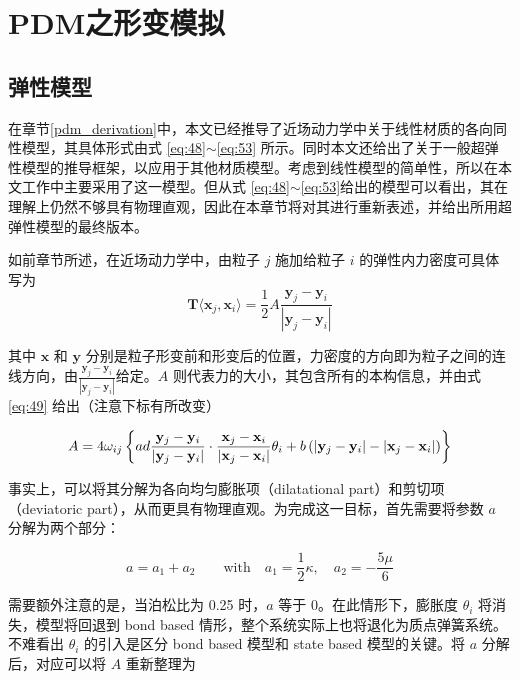 ﻿\chapter{PDM之形变模拟}

\section{弹性模型}
\label{elasitcity_model}

在章节\ref{pdm_derivation}中，本文已经推导了近场动力学中关于线性材质的各向同性模型，其具体形式由式 \ref{eq:48}$\sim$\ref{eq:53} 所示。同时本文还给出了关于一般超弹性模型的推导框架，以应用于其他材质模型。考虑到线性模型的简单性，所以在本文工作中主要采用了这一模型。但从式 \ref{eq:48}$\sim$\ref{eq:53}给出的模型可以看出，其在理解上仍然不够具有物理直观，因此在本章节将对其进行重新表述，并给出所用超弹性模型的最终版本。

如前章节所述，在近场动力学中，由粒子 $j$ 施加给粒子 $i$ 的弹性内力密度可具体写为
\begin{equation}
\mathbf{T}\langle\mathbf{x}_j,\mathbf{x}_i\rangle = \frac{1}{2}A\frac{\mathbf{y}_j-\mathbf{y}_i}{|\mathbf{y}_j-\mathbf{y}_i|}
\end{equation}

其中 $\mathbf{x}$ 和 $\mathbf{y}$ 分别是粒子形变前和形变后的位置，力密度的方向即为粒子之间的连线方向，由$\frac{\mathbf{y}_j-\mathbf{y}_i}{|\mathbf{y}_j-\mathbf{y}_i|}$给定。$A$ 则代表力的大小，其包含所有的本构信息，并由式 \ref{eq:49} 给出（注意下标有所改变）

\begin{equation}
A = 4\omega_{ij}\left\{ad\frac{\mathbf{y}_j-\mathbf{y}_i}{|\mathbf{y}_j-\mathbf{y}_i|}\cdot\frac{\mathbf{x}_j-\mathbf{x}_i}{|\mathbf{x}_j-\mathbf{x}_i|}\theta_i
   +b\left(|\mathbf{y}_j - \mathbf{y}_i| - |\mathbf{x}_j - \mathbf{x}_i|\right) \right\}
\end{equation}

事实上，可以将其分解为各向均匀膨胀项（dilatational part）和剪切项（deviatoric part），从而更具有物理直观。为完成这一目标，首先需要将参数 $a$ 分解为两个部分：

\begin{equation}
a = a_1 + a_2 \qquad \mathrm{with}\quad a_1 = \frac{1}{2}\kappa ,\quad a_2 = -\frac{5\mu}{6}
\end{equation}

需要额外注意的是，当泊松比为 0.25 时，$a$ 等于 0。在此情形下，膨胀度 $\theta_i$ 将消失，模型将回退到 bond based 情形，整个系统实际上也将退化为质点弹簧系统。不难看出 $\theta_i$ 的引入是区分 bond based 模型和 state based 模型的关键。将 $a$ 分解后，对应可以将 $A$ 重新整理为

